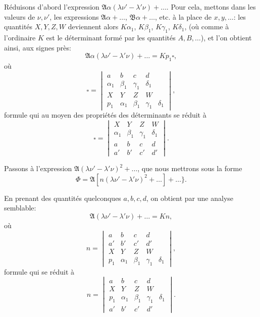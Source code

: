 \documentclass[12pt,a4paper]{article}
\theoremstyle{definition}
\begin{document}
R\'{e}duisons d'abord l'expression $\mathfrak{A}\alpha(\lambda \nu' - \lambda' \nu) + \ldots$. Pour cela, mettons dans les valeurs de $\nu, \nu'$, les expressions $\mathfrak{A}\alpha + \ldots$, $\mathfrak{B}\alpha + \ldots$, etc. \`{a} la place de $x, y, \ldots$: les quantit\'{e}s $X, Y, Z, W$ deviennent alors $K\alpha_1$, $K\beta_1$, $K\gamma_1$, $K\delta_1$, (o\`{u} comme \`{a} l'ordinaire $K$ est le d\'{e}terminant form\'{e} par les quantit\'{e}s $A, B, \ldots$), et l'on obtient ainsi, aux signes pr\`{e}s:
\[
\mathfrak{A}\alpha(\lambda \nu' - \lambda' \nu) + \ldots = Kp_1 \square,
\]
o\`{u}
\[
\square =
\begin{vmatrix}
a & b & c & d \\
\alpha_1 & \beta_1 & \gamma_1 & \delta_1 \\
X & Y & Z & W \\
p_1 & \alpha_1 & \beta_1 & \gamma_1 & \delta_1
\end{vmatrix},
\]
formule qui au moyen des propri\'{e}t\'{e}s des d\'{e}terminants se r\'{e}duit \`{a}
\[
\square =
\begin{vmatrix}
X & Y & Z & W \\
\alpha_1 & \beta_1 & \gamma_1 & \delta_1 \\
a & b & c & d \\
a' & b' & c' & d'
\end{vmatrix}.
\]

Passons \`{a} l'expression $\mathfrak{A}(\lambda \nu' - \lambda' \nu)^2 + \ldots$, que nous mettrons sous la forme
\[
\Phi = \mathfrak{A}[n(\lambda \nu' - \lambda' \nu)^2 + \ldots] + \ldots\}.
\]

En prenant des quantit\'{e}s quelconques $a, b, c, d$, on obtient par une analyse semblable:
\[
\mathfrak{A}(\lambda \nu' - \lambda' \nu) + \ldots = Kn,
\]
o\`{u}
\[
n =
\begin{vmatrix}
a & b & c & d \\
a' & b' & c' & d' \\
X & Y & Z & W \\
p_1 & \alpha_1 & \beta_1 & \gamma_1 & \delta_1
\end{vmatrix},
\]
formule qui se r\'{e}duit \`{a}
\[
n =
\begin{vmatrix}
a & b & c & d \\
X & Y & Z & W \\
p_1 & \alpha_1 & \beta_1 & \gamma_1 & \delta_1 \\
a' & b' & c' & d'
\end{vmatrix}.
\]
\end{document}

